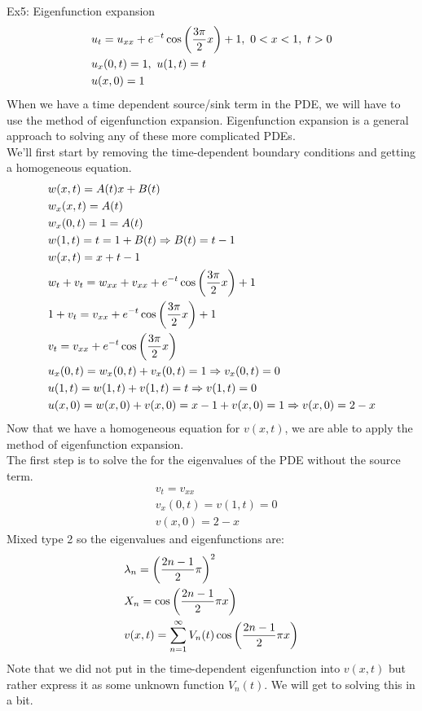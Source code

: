 \documentclass[11pt, fleqn]{article}
\begin{document}
Ex5: Eigenfunction expansion
\begin{align*}
    &u_t=u_{xx}+e^{-t}\cos\brround{\frac{3\pi}{2}x}+1,\ 0<x<1,\ t>0\\
    &u_x(0,t)=1,\ u(1,t)=t\\
    &u(x,0)=1
\end{align*}
When we have a time dependent source/sink term in the PDE, we will have to use the method of eigenfunction expansion. Eigenfunction expansion is a general approach to solving any of these more complicated PDEs.\\
We'll first start by removing the time-dependent boundary conditions and getting a homogeneous equation.
\begin{align*}
    &w(x,t)=A(t)x+B(t)\\
    &w_x(x,t)=A(t)\\
    &w_x(0,t)=1=A(t)\\
    &w(1,t)=t=1+B(t)\Rightarrow B(t)=t-1\\
    &w(x,t)=x+t-1\\
    &w_t+v_t=w_{xx}+v_{xx}+e^{-t}\cos\left( \frac{3\pi}{2}x \right)+1\\
    &1+v_t=v_{xx}+e^{-t}\cos\left( \frac{3\pi}{2}x \right)+1\\
    &v_t=v_{xx}+e^{-t}\cos\left( \frac{3\pi}{2}x \right)\\
    &u_x(0,t)=w_x(0,t)+v_x(0,t)=1\Rightarrow v_x(0,t)=0\\
    &u(1,t)=w(1,t)+v(1,t)=t\Rightarrow v(1,t)=0\\
    &u(x,0)=w(x,0)+v(x,0)=x-1+v(x,0)=1\Rightarrow v(x,0)=2-x
\end{align*}
Now that we have a homogeneous equation for $v(x,t)$, we are able to apply the method of eigenfunction expansion.\\
The first step is to solve the for the eigenvalues of the PDE without the source term.
\begin{align*}
    &v_t=v_{xx}\\
    &v_x(0,t)=v(1,t)=0\\
    &v(x,0)=2-x
\end{align*}
Mixed type 2 so the eigenvalues and eigenfunctions are:\\
\begin{align*}
    &\lambda_n=\left( \frac{2n-1}{2}\pi \right)^2\\
    &X_n=\cos\left( \frac{2n-1}{2}\pi x \right)\\
    &v(x,t)=\sum_{n=1}^\infty V_n(t)\cos\left( \frac{2n-1}{2}\pi x \right)
\end{align*}
Note that we did not put in the time-dependent eigenfunction into $v(x,t)$ but rather express it as some unknown function $V_n(t)$. We will get to solving this in a bit.\\
\end{document}
